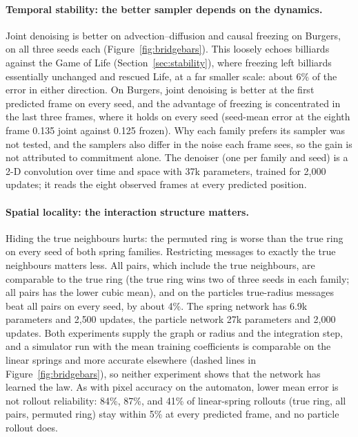 \documentclass[11pt]{article}
\begin{document}
\paragraph{Temporal stability: the better sampler depends on the dynamics.}
Joint denoising is better on advection--diffusion and causal freezing on Burgers, on all three seeds each (Figure~\ref{fig:bridgebars}). This loosely echoes billiards against the Game of Life (Section~\ref{sec:stability}), where freezing left billiards essentially unchanged and rescued Life, at a far smaller scale: about 6\% of the error in either direction. On Burgers, joint denoising is better at the first predicted frame on every seed, and the advantage of freezing is concentrated in the last three frames, where it holds on every seed (seed-mean error at the eighth frame 0.135 joint against 0.125 frozen). Why each family prefers its sampler was not tested, and the samplers also differ in the noise each frame sees, so the gain is not attributed to commitment alone. The denoiser (one per family and seed) is a 2-D convolution over time and space with 37k parameters, trained for 2{,}000 updates; it reads the eight observed frames at every predicted position.

\paragraph{Spatial locality: the interaction structure matters.}
Hiding the true neighbours hurts: the permuted ring is worse than the true ring on every seed of both spring families. Restricting messages to exactly the true neighbours matters less. All pairs, which include the true neighbours, are comparable to the true ring (the true ring wins two of three seeds in each family; all pairs has the lower cubic mean), and on the particles true-radius messages beat all pairs on every seed, by about 4\%. The spring network has 6.9k parameters and 2{,}500 updates, the particle network 27k parameters and 2{,}000 updates. Both experiments supply the graph or radius and the integration step, and a simulator run with the mean training coefficients is comparable on the linear springs and more accurate elsewhere (dashed lines in Figure~\ref{fig:bridgebars}), so neither experiment shows that the network has learned the law. As with pixel accuracy on the automaton, lower mean error is not rollout reliability: 84\%, 87\%, and 41\% of linear-spring rollouts (true ring, all pairs, permuted ring) stay within 5\% at every predicted frame, and no particle rollout does.
\end{document}
